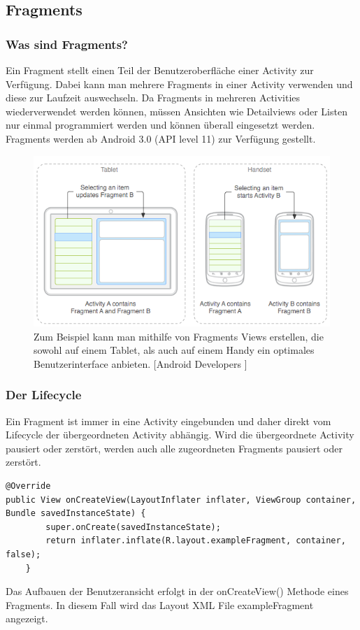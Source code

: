 \documentclass[FIPLY_base.tex]{subfiles}
\begin{document}
\subsection{Fragments}
\subsubsection{Was sind Fragments?}
Ein Fragment stellt einen Teil der Benutzeroberfläche einer Activity zur Verfügung. Dabei kann man mehrere Fragments in einer Activity verwenden und diese zur Laufzeit auswechseln.
Da Fragments in mehreren Activities wiederverwendet werden können, müssen Ansichten wie Detailviews oder Listen nur einmal programmiert werden und können überall eingesetzt werden.
Fragments werden ab Android 3.0 (API level 11) zur Verfügung gestellt. 

\begin{figure}[H]
\includegraphics[scale=0.60]{img/fragments_modules}
\caption{Zum Beispiel kann man mithilfe von Fragments Views erstellen, die sowohl auf einem Tablet, als auch auf einem Handy ein optimales Benutzerinterface anbieten. 
[Android Developers \cite{adFragmentsGuide}]}
\end{figure}

\newpage
\subsubsection{Der Lifecycle}
Ein Fragment ist immer in eine Activity eingebunden und daher direkt vom Lifecycle der übergeordneten Activity abhängig.
Wird die übergeordnete Activity pausiert oder zerstört, werden auch alle zugeordneten Fragments pausiert oder zerstört. %
\ \\
\begin{lstlisting}
@Override
public View onCreateView(LayoutInflater inflater, ViewGroup container, Bundle savedInstanceState) {
        super.onCreate(savedInstanceState);
        return inflater.inflate(R.layout.exampleFragment, container, false);
    }
\end{lstlisting}
Das Aufbauen der Benutzeransicht erfolgt in der onCreateView() Methode eines Fragments. In diesem Fall wird das Layout XML File exampleFragment angezeigt.
\end{document}

